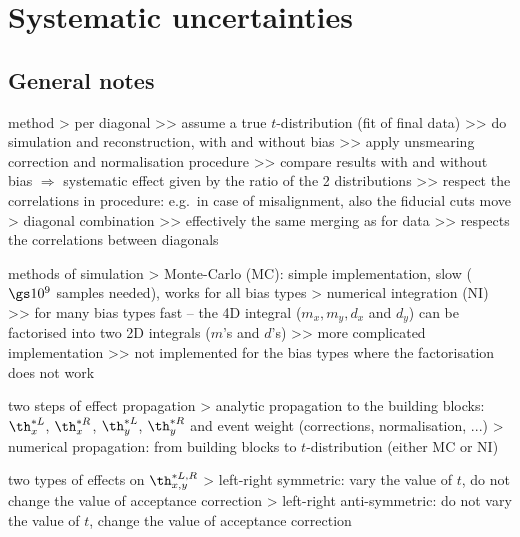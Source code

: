 \iffalse
\> \plot{t_distributions/t_dist_cmp_bunch.pdf} : comparison of $t$-distributions from different bunches (fill 5317)

\> \plot{t_distributions/t_dist_rel.pdf} : merged $t$-distribution in a relative reference frame
\fi



\chapter[systematics]{Systematic uncertainties}

\iffalse

\section[systematics-general]{General notes}

\> method
\>> per diagonal
\>>> assume a true $t$-distribution (fit of final data)
\>>> do simulation and reconstruction, with and without bias
\>>> apply unsmearing correction and normalisation procedure
\>>> compare results with and without bias $\Rightarrow$ systematic effect given by the ratio of the 2 distributions
\>>> respect the correlations in procedure: e.g.~in case of misalignment, also the fiducial cuts move
\>> diagonal combination
\>>> effectively the same merging as for data
\>>> respects the correlations between diagonals

 methods of simulation
\>> Monte-Carlo (MC): simple implementation, slow ($\gs 10^9$ samples needed), works for all bias types
\>> numerical integration (NI)
\>>> for many bias types fast -- the 4D integral ($m_x, m_y, d_x$ and $d_y$) can be factorised into two 2D integrals ($m$'s and $d$'s)
\>>> more complicated implementation
\>>> not implemented for the bias types where the factorisation does not work

\> two steps of effect propagation
\>> analytic propagation to the building blocks: $\th^{*L}_x$, $\th^{*R}_x$, $\th^{*L}_y$, $\th^{*R}_y$ and event weight (corrections, normalisation, ...)
\>> numerical propagation: from building blocks to $t$-distribution (either MC or NI)

\> two types of effects on $\th^{*L,R}_{x, y}$
\>> left-right symmetric: vary the value of $t$, do not change the value of acceptance correction
\>> left-right anti-symmetric: do not vary the value of $t$, change the value of acceptance correction


